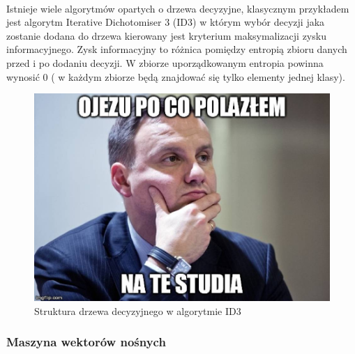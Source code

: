 \documentclass[a4paper,12pt,twoside]{article}
\begin{document}
\paragraph{}
Istnieje wiele algorytmów opartych o drzewa decyzyjne, klasycznym przykładem jest algorytm Iterative Dichotomiser 3 (ID3) w którym wybór decyzji jaka zostanie dodana do drzewa kierowany jest kryterium maksymalizacji zysku informacyjnego. Zysk informacyjny to różnica pomiędzy entropią zbioru danych przed i po dodaniu decyzji. W zbiorze uporządkowanym entropia powinna wynosić 0 ( w każdym zbiorze będą znajdować się tylko elementy jednej klasy).
\begin{figure}[h]
    \centering
    \includegraphics[width=1\textwidth]{dudel.jpg}
    \caption{Struktura drzewa decyzyjnego w algorytmie ID3}
\end{figure}


\subsubsection{Maszyna wektorów nośnych}
\end{document}

